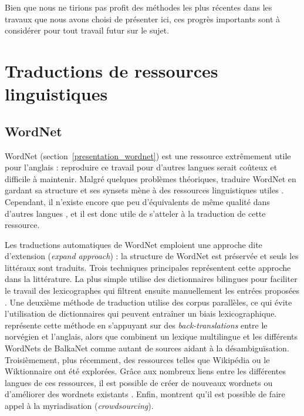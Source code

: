 Bien que nous ne tirions pas profit des méthodes les plus récentes dans les
travaux que nous avons choisi de présenter ici, ces progrès importants sont à
considérer pour tout travail futur sur le sujet.

\section{Traductions de ressources linguistiques}
\label{sec:translation}

\subsection{WordNet}

WordNet (section~\ref{presentation_wordnet}) est une ressource extrêmement
utile pour l'anglais : reproduire ce travail pour d'autres langues serait
coûteux et difficile à maintenir. Malgré quelques problèmes théoriques,
traduire WordNet en gardant sa structure et ses synsets mène à des ressources
linguistiques utiles \citep{fellbaum2007connecting,demelo2008utility}.
Cependant, il n'existe encore que peu d'équivalents de même qualité dans
d'autres langues \citep{bond2012survey}, et il est donc utile de s'atteler à la
traduction de cette ressource.

Les traductions automatiques de WordNet emploient une approche dite d'extension
(\textit{expand approach}) : la structure de WordNet est préservée et seuls les
littéraux sont traduits. Trois techniques principales représentent cette
approche dans la littérature. La plus simple utilise des dictionnaires
bilingues pour faciliter le travail des lexicographes qui filtrent ensuite
manuellement les entrées proposées
\citep{vossen1998eurowordnet,pianta2002developing,tufis2004balkanet}. Une
deuxième méthode de traduction utilise des corpus parallèles, ce qui évite
l'utilisation de dictionnaires qui peuvent entraîner un biais lexicographique.
\cite{dyvik2004translations} représente cette méthode en s'appuyant sur des
\textit{back-translations} entre le norvégien et l'anglais, alors que
\citep{sagot2008construction} combinent un lexique multilingue et les
différents WordNets de BalkaNet comme autant de sources aidant à la
désambiguïsation. Troisièmement, plus récemment, des ressources telles que
Wikipédia ou le Wiktionnaire ont été explorées. Grâce aux nombreux liens entre
les différentes langues de ces ressources, il est possible de créer de nouveaux
wordnets
\citep{demelo2009towards,navigli2010babelnet,bond2013linking,aliabadi2014towards,oliver2014wn}
ou d'améliorer des wordnets existants \citep{hanoka2012wordnet}. Enfin,
\cite{fiser2014slowcrowd} montrent qu'il est possible de faire appel à la
myriadisation (\textit{crowdsourcing}).

